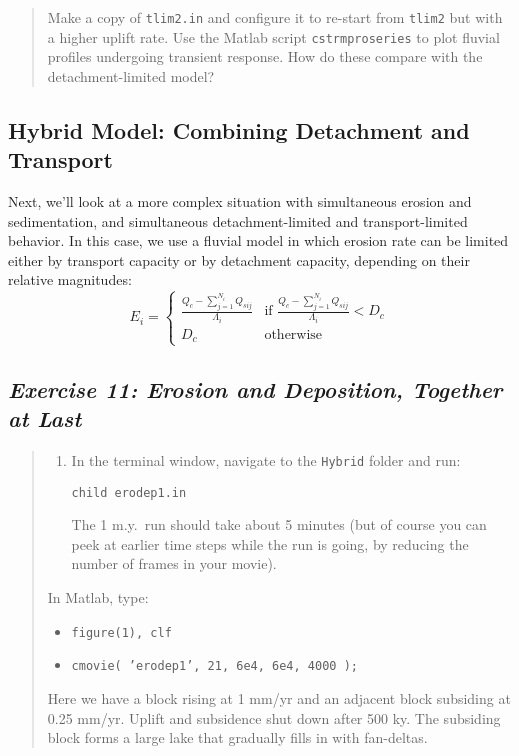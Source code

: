 \documentclass[12pt,reqno]{amsart}
\begin{document}
\begin{quote}
\small
{ Make a copy of {\tt tlim2.in} and
  configure it to re-start from {\tt tlim2} but with a higher uplift
  rate. Use the Matlab script {\tt cstrmproseries} to plot fluvial
  profiles undergoing transient response. How do these compare with
  the detachment-limited model?}
\end{quote}

\subsection{Hybrid Model: Combining Detachment and Transport}

Next, we'll look at a more complex situation with simultaneous erosion and sedimentation, and simultaneous detachment-limited and transport-limited behavior. In this case, we use a fluvial model in which erosion rate can be limited either by transport capacity or by detachment capacity, depending on their relative magnitudes:
\begin{equation}
E_i =
\begin{cases}
\frac{Q_c - \sum_{j=1}^{N_i} Q_{sij}}{\Lambda_i} & \text{if $\frac{Q_c - \sum_{j=1}^{N_i} Q_{sij}}{\Lambda_i} < D_c$} \\
D_c & \text{otherwise}
\end{cases}
\end{equation}

\subsection*{\em Exercise 11: Erosion and Deposition, Together at Last}

\begin{quote}
\small
{\sf
\begin{enumerate}
\item
In the terminal window, navigate to the {\tt Hybrid} folder and run:

{\tt child erodep1.in}

\noindent
The 1 m.y.\ run should take about 5 minutes (but of course you can
peek at earlier time steps while the run is going, by reducing the
number of frames in your movie).
\end{enumerate}

\noindent
In Matlab, type: 
\begin{itemize}
\setcounter{enumi}{1}
\item
{\tt figure(1), clf}
\item
{\tt cmovie( 'erodep1', 21, 6e4, 6e4, 4000 );}
\end{itemize}

\noindent
Here we have a block rising at 1 mm/yr and an adjacent block subsiding
at 0.25 mm/yr. Uplift and subsidence shut down after 500 ky. The
subsiding block forms a large lake that gradually fills in with
fan-deltas.
}
\end{quote}
\end{document}
